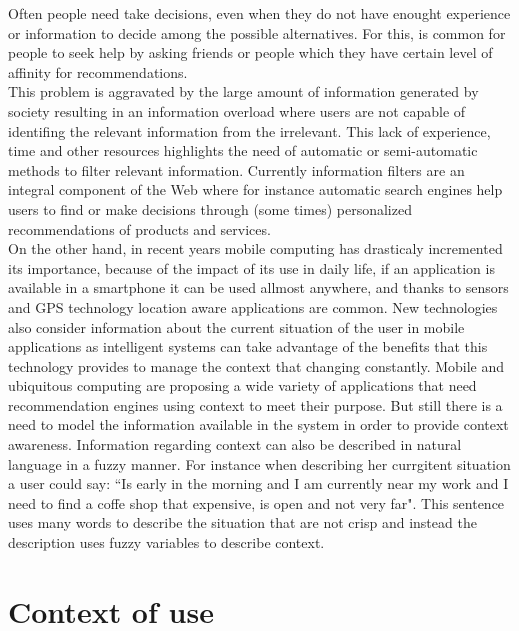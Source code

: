 Often people need take decisions, even when they do not
have enought experience or information to decide among 
the possible alternatives. 
For this, is common for people to seek help by asking friends 
or people which they  
have certain level of affinity for recommendations.\\
This problem is aggravated by the large amount of information 
generated by society 
resulting in an information overload where users are not capable of
identifing the relevant information from the irrelevant.
This lack of experience, time and other resources 
highlights the need of automatic or semi-automatic methods 
to filter relevant information. Currently information filters are
an integral component of the Web where for instance
automatic search engines help users to find or make 
decisions through (some times) personalized recommendations
of products and services. \\ On the other hand, in recent
years  mobile computing has drasticaly incremented its importance, 
because of the impact of its use in daily life, if an application 
is available in a smartphone it can be used allmost anywhere, and thanks
to sensors and GPS technology location aware applications are common.
New technologies also consider information about the current situation of the
user in mobile applications as intelligent systems can take advantage of the
benefits that this technology provides to manage the context that changing
constantly. Mobile and ubiquitous computing\cite{noguera2012mobile}
\cite{chiou2010adaptive} are proposing a wide variety of applications
that need recommendation engines using context to meet their
purpose. But still there is a need to model the information available in
the system in order to provide context awareness. Information regarding 
context can also be described in natural language in a fuzzy manner. For
instance when describing her currgitent situation a user could say: ``Is early in
the morning and I am currently near my work and I need to find a coffe
shop that expensive, is open and not very far". 
This sentence uses many words to describe the situation that are not 
crisp and instead the description uses fuzzy variables to describe context.  

\section{Context of use}\label{contextofuse}

